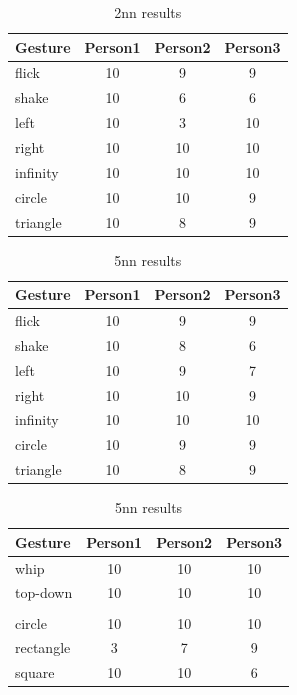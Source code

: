 \documentclass{sigchi}
\begin{document}
\begin{table}[ht]
  \centering
  \begin{tabular}{l*{3}{c}}
    Gesture & Person1 & Person2 & Person3 \\
    \hline
	flick & 10 & 9 & 9 \\
    shake & 10 & 6 & 6 \\
    left & 10 & 3 & 10 \\
    right & 10 & 10 & 10 \\
    infinity & 10 & 10 & 10 \\
    circle & 10 & 10 & 9 \\
    triangle & 10 & 8 & 9 
  \end{tabular}
  \caption{2nn results}
  \label{tab:table2}
\end{table}

\begin{table}[ht]
  \centering
  \begin{tabular}{l*{3}{c}}
    Gesture & Person1 & Person2 & Person3 \\
    \hline
	flick & 10 & 9 & 9 \\
    shake & 10 & 8 & 6 \\
    left & 10 & 9 & 7 \\
    right & 10 & 10 & 9 \\
    infinity & 10 & 10 & 10 \\
    circle & 10 & 9 & 9 \\
    triangle & 10 & 8 & 9 
  \end{tabular}
  \caption{5nn results}
  \label{tab:table3}
\end{table}

\begin{table}[ht]
  \centering
  \begin{tabular}{l*{3}{c}}
    Gesture & Person1 & Person2 & Person3 \\
    \hline
    
    whip & 10 & 10 & 10\\
    top-down & 10 & 10 & 10\\
    \\		
		circle & 10 & 10 & 10 \\
        rectangle & 3 & 7 & 9 \\
        square & 10 & 10 & 6 \\    
 
  \end{tabular}
  \caption{5nn results}
  \label{tab:table4}
\end{table}
\end{document}
